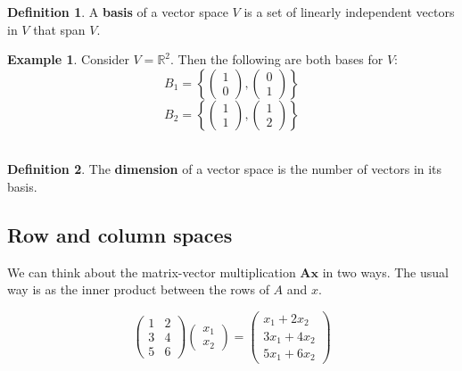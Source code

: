 \documentclass[]{book}
\theoremstyle{definition}
\newtheorem{definition}{Definition}[chapter]
\theoremstyle{definition}
\newtheorem{example}{Example}[chapter]
\theoremstyle{definition}
\theoremstyle{remark}
\begin{document}
\begin{definition}
\protect\hypertarget{def:basis}{}{\label{def:basis} }A \textbf{basis} of a vector space \(V\) is a set of linearly independent vectors in \(V\) that span \(V\).
\end{definition}

\begin{example}
\protect\hypertarget{exm:basisRp}{}{\label{exm:basisRp} }Consider \(V=\mathbb{R}^2\). Then the following are both bases for \(V\):
\[B_1=\left\{\left(\begin{array}{c}1\\0\end{array}\right), \left(\begin{array}{c}0\\1\end{array}\right)\right\}
\]
\[B_2=\left\{\left(\begin{array}{c}1\\1\end{array}\right), \left(\begin{array}{c}1\\2\end{array}\right)\right\}
\]\\
\end{example}

\begin{definition}
\protect\hypertarget{def:dimension}{}{\label{def:dimension} }The \textbf{dimension} of a vector space is the number of vectors in its basis.
\end{definition}

\hypertarget{colsspace}{%
\subsection{Row and column spaces}\label{colsspace}}

We can think about the matrix-vector multiplication \(\boldsymbol A\boldsymbol x\) in two ways. The usual way is as the inner product between the rows of \(A\) and \(x\).

\[ \left( \begin{array}{cc} 1 & 2\\ 3&4\\5&6\end{array}\right) \left(\begin{array}{c}x_1\\ x_2\end{array}\right) = \left(\begin{array}{c} x_1+2x_2\\3x_1+4x_2\\5x_1+6x_2\end{array}\right)\]
\end{document}

